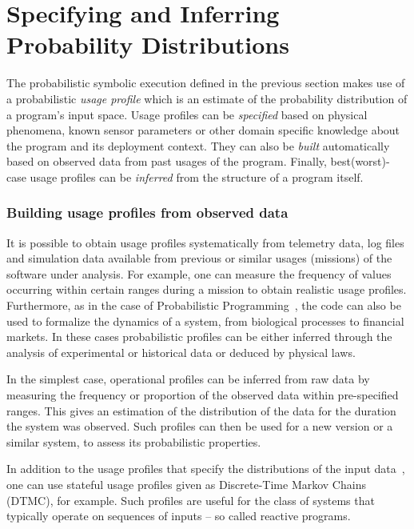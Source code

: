 \section{Specifying and Inferring Probability Distributions}
\label{sec:probspecs}

The probabilistic symbolic execution defined in the previous section
makes use of a probabilistic {\em usage profile} which is an estimate
of the probability distribution of a program's input space.  Usage
profiles can be {\em specified} based on physical phenomena, known
sensor parameters or other domain specific knowledge about the program
and its deployment context.  They can also be {\em built}
automatically based on observed data from past usages of the program.
Finally, best(worst)-case usage profiles can be {\em inferred} from
the structure of a program itself.  

\subsubsection{Building usage profiles from observed data}
It is possible to obtain usage profiles systematically from
telemetry data, log files and simulation
data available from previous or similar usages (missions) of 
the software under analysis.
For example, one can measure
the frequency of values occurring within certain ranges
during a mission to obtain realistic usage profiles. 
Furthermore, as in the case of Probabilistic
Programming~\cite{gordon-etal-icse-fose2014}, the code can also be
used to formalize the dynamics of a system, from biological processes
to financial markets. In these cases probabilistic profiles can be
either inferred through the analysis of experimental or historical
data or deduced by physical laws.


In the simplest case, operational profiles can be inferred from raw
data by measuring the frequency or proportion of the observed data
within pre-specified ranges.  This gives an estimation of the
distribution of the data for the duration the system was observed.
Such profiles can then be used for a new version or a similar system,
to assess its probabilistic properties.

In addition to the usage profiles that specify the distributions of
the input data~\cite{ICSE13}, one can use stateful usage profiles
given as Discrete-Time Markov Chains (DTMC), for example.  Such
profiles are useful for the class of systems that typically operate on
sequences of inputs -- so called reactive programs.

